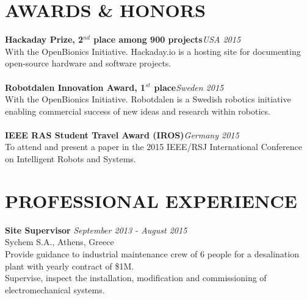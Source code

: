 \documentclass[11pt]{res} %
\begin{document}
\begin{resume}
\vspace{0.1in} %

\section{AWARDS \& HONORS} 
\vspace{4pt} %
\small \textbf  {Hackaday Prize, 2$^{nd}$ place among 900 projects}\hfill {\sl USA 2015}
\\With the OpenBionics Initiative. Hackaday.io is a hosting site for documenting open-source hardware and software projects.
\\\\ \small \textbf  {Robotdalen Innovation Award, 1$^{st}$ place}\hfill {\sl Sweden 2015}
\\With the OpenBionics Initiative. Robotdalen is a Swedish robotics initiative enabling commercial success of new ideas and research within robotics. 
\\\\ \small \textbf  {IEEE RAS Student Travel Award (IROS)}\hfill {\sl Germany 2015}\\
To attend and present a paper in the 2015 IEEE/RSJ International Conference on
Intelligent Robots and Systems.
 
\newpage



\section{PROFESSIONAL EXPERIENCE} 
\vspace{4pt} %
\small\textbf{Site Supervisor} \hfill {\sl September 2013 - August 2015} 
\\Sychem S.A., Athens, Greece
\\  Provide guidance to industrial maintenance crew of 6 people for a desalination plant with yearly contract of \$1M.
\\  Supervise, inspect the installation, modification and commissioning of electromechanical systems.


\end{resume}
\end{document}
